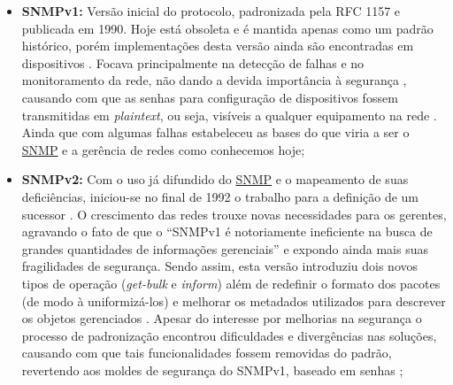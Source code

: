 \documentclass[twoside,english,brazilian]{UNISINOSmonografia}
\begin{document}
\begin{itemize}
\item \textbf{SNMPv1:}
Versão inicial do protocolo, padronizada pela RFC 1157
e publicada em 1990. 
Hoje está obsoleta e é mantida apenas como um padrão histórico, porém 
implementações desta versão ainda são encontradas em dispositivos 
\cite{Mauro2009,Ding2009}.
Focava principalmente na detecção de falhas e no monitoramento da rede, não 
dando a devida importância à segurança \cite{Clemm2006}, causando com que as 
senhas para configuração de dispositivos fossem transmitidas em 
\textit{plaintext}, ou seja, visíveis a qualquer equipamento na rede 
\cite{Hunt1997,Ding2009}.
Ainda que com algumas falhas estabeleceu as bases do que viria a ser o \hyperref[siglas]{SNMP} 
e a gerência de redes como conhecemos hoje;

\item \textbf{SNMPv2:}
Com o uso já difundido do \hyperref[siglas]{SNMP} e o mapeamento de suas deficiências, iniciou-se no 
final de 1992 o trabalho para a definição de um sucessor \cite{Hunt1997}.
O crescimento das redes trouxe novas necessidades para os gerentes, agravando 
o fato de que o ``SNMPv1 é notoriamente ineficiente na busca de grandes 
quantidades de informações gerenciais'' \cite[p.~258]{Clemm2006} e expondo ainda mais 
suas fragilidades de segurança.
Sendo assim, esta versão introduziu dois novos tipos de operação
(\textit{get-bulk} e \textit{inform})
além de redefinir o formato dos pacotes (de modo à uniformizá-los) e melhorar 
os metadados utilizados para descrever os objetos gerenciados 
\cite{Hunt1997,stallings1999snmp,Mauro2009}. 
Apesar do interesse por melhorias na segurança o processo de padronização 
encontrou dificuldades e divergências nas soluções, causando com que tais 
funcionalidades fossem removidas do padrão, revertendo aos moldes de segurança 
do SNMPv1, baseado em senhas \cite{Clemm2006,Ding2009};


\end{itemize}
\end{document}
